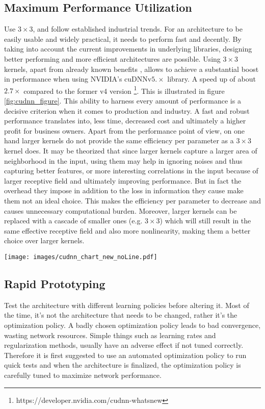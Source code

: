 \documentclass{article} \usepackage{lets_keepit_simple,times}
\begin{document}
\subsection{Maximum Performance Utilization}
Use $3 \times 3$, and follow established industrial trends. For an architecture to be easily usable and widely practical, it needs to perform fast and decently. By taking into account the current improvements in underlying libraries, designing better performing and more efficient architectures are possible. Using $3 \times 3$ kernels, apart from already known benefits \cite{Simonyan_VGG_2014}, allows to achieve a substantial boost in performance when using NVIDIA's cuDNNv$5.\times$ library. A speed up of about $2.7\times $ compared to the former v4 version \footnote{https://developer.nvidia.com/cudnn-whatsnew}. This is illustrated in figure \ref{fig:cudnn_figure}. This ability to harness every amount of performance is a decisive criterion when it comes to production and industry. A fast and robust performance translates into, less time, decreased cost and ultimately a higher profit for business owners. Apart from the performance point of view, on one hand larger kernels do not provide the same efficiency per parameter as a $3 \times 3$ kernel does. It may be theorized that since larger kernels capture a larger area of neighborhood in the input, using them may help in ignoring noises and thus capturing better features, or more interesting correlations in the input because of larger receptive field and ultimately improving performance. But in fact the overhead they impose in addition to the loss in information they cause make them not an ideal choice. This makes the efficiency per parameter to decrease and causes unnecessary computational burden. Moreover, larger kernels can be replaced with a cascade of smaller ones (e.g. $3 \times 3$) which will still result in the same effective receptive field and also more nonlinearity, making them a better choice over larger kernels. 

\begin{figure*}[h]
\begin{center}
\texttt{[image: images/cudnn\_chart\_new\_noLine.pdf]}
\end{center}
 \caption{Using $3 \times 3$ kernels results in $2.7\times$ faster training when using cuDNNv$5.\times$}
\label{fig:cudnn_figure}
\end{figure*}
\subsection{Rapid Prototyping}
Test the architecture with different learning policies before altering it. Most of the time, it's not the architecture that needs to be changed, rather it's the optimization policy. A badly chosen optimization policy leads to bad convergence, wasting network resources. Simple things such as learning rates and regularization methods, usually have an adverse effect if not tuned correctly. Therefore it is first suggested to use an automated optimization policy to run quick tests and when the architecture is finalized, the optimization policy is carefully tuned to maximize network performance.
\end{document}
